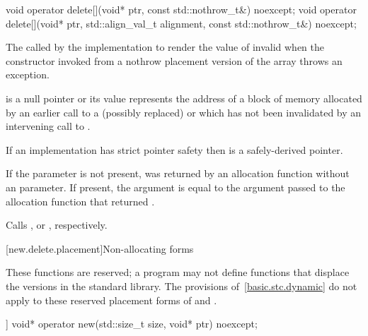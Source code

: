 %
\begin{itemdecl}
void operator delete[](void* ptr, const std::nothrow_t&) noexcept;
void operator delete[](void* ptr, std::align_val_t alignment, const std::nothrow_t&) noexcept;
\end{itemdecl}

\begin{itemdescr}
\pnum
\effects
The
called by the implementation
to render the value of  invalid
when the constructor invoked from a nothrow
placement version of the array  throws an exception.

\pnum
\replaceable
{}

\pnum
\expects
{} is a null pointer or
its value represents the address of
a block of memory allocated by
an earlier call to a (possibly replaced)
or
which has not been invalidated by an intervening call to
.

\pnum
\expects
If an implementation has strict pointer safety
then  is a safely-derived pointer.

\pnum
\expects
If the  parameter is not present,
 was returned by an allocation function
without an  parameter.
If present, the  argument
is equal to the  argument
passed to the allocation function that returned .

\pnum
{}
Calls ,
or ,
respectively.
\end{itemdescr}

[new.delete.placement]{Non-allocating forms}

\pnum
These functions are reserved; a \Cpp{} program may not define functions that displace
the versions in the \Cpp{} standard library.
The provisions of~\ref{basic.stc.dynamic} do not apply to these reserved
placement forms of  and .

%
\begin{itemdecl}
[[nodiscard]] void* operator new(std::size_t size, void* ptr) noexcept;
\end{itemdecl}

